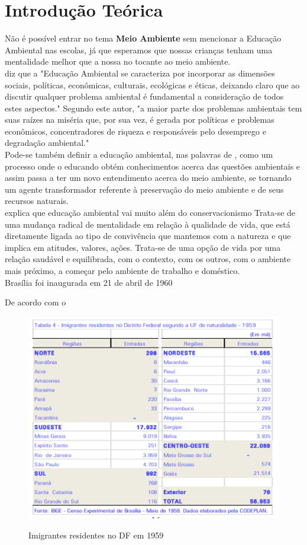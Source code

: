 \chapter{Introdução Teórica}

Não é possível entrar no tema \textbf{Meio Ambiente} sem mencionar a Educação Ambiental nas escolas, já que esperamos que nossas crianças tenham uma mentalidade melhor que a nossa no tocante ao meio ambiente.\\

  diz que a "Educação Ambiental se caracteriza por
incorporar as dimensões sociais, políticas, econômicas,
culturais, ecológicas e éticas, deixando claro que ao discutir
qualquer problema ambiental é fundamental a consideração
de todos estes aspectos." Segundo este autor, "a maior parte
dos problemas ambientais tem suas raízes na miséria que,
por sua vez, é gerada por políticas e problemas econômicos,
concentradores de riqueza e responsáveis pelo desemprego
e degradação ambiental."\\

Pode-se também definir a educação ambiental, nas palavras de , como um processo
onde o educando obtém conhecimentos acerca das
questões ambientais e assim passa a ter um novo
entendimento acerca do meio ambiente, se tornando um
agente transformador referente à preservação do meio
ambiente e de seus recursos naturais. \\

 explica que educação ambiental vai muito além do conservacionismo
Trata-se de uma mudança radical de mentalidade em
relação à qualidade de vida, que está diretamente ligada
ao tipo de convivência que mantemos com a natureza e
que implica em atitudes, valores, ações. Trata-se de uma
opção de vida por uma relação saudável e equilibrada,
com o contexto, com os outros, com o ambiente mais
próximo, a começar pelo ambiente de trabalho e
doméstico.\\


Brasília foi inaugurada em 21 de abril de 1960

De acordo com o 

\begin{figure}[h]
    \centering
    \includegraphics[width=0.7\linewidth]{fig/imigrantes-1959}
    \label{fig:imigrantes-1959}
    \caption{Imigrantes residentes no DF em 1959}
\end{figure}

